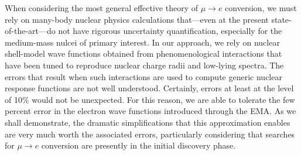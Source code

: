 \documentclass{book}[letterpaper,12pt]
\begin{document}
When considering the most general effective theory of $\mu\rightarrow e$ conversion, we must rely on many-body nuclear physics calculations that---even at the present state-of-the-art---do not have rigorous uncertainty quantification, especially for the medium-mass nulcei of primary interest. In our approach, we rely on nuclear shell-model wave functions obtained from phenomenological interactions that have been tuned to reproduce nuclear charge radii and low-lying spectra. The errors that result when such interactions are used to compute generic nuclear response functions are not well understood. Certainly, errors at least at the level of 10\% would not be unexpected. For this reason, we are able to tolerate the few percent error in the electron wave functions introduced through the EMA. As we shall demonstrate, the dramatic simplifications that this approximation enables are very much worth the associated errors, particularly considering that searches for $\mu\rightarrow e$ conversion are presently in the initial discovery phase.
\end{document}

